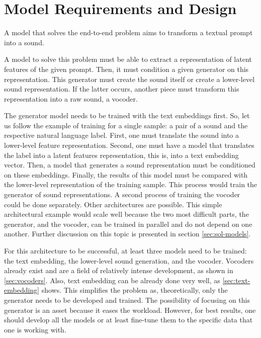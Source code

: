 \section{Model Requirements and Design} \label{sec:model}

A model that solves the end-to-end problem aims to transform a textual prompt into a sound.

A model to solve this problem must be able to extract a representation of latent features of the given prompt. Then, it must condition a given generator on this representation. This generator must create the sound itself or create a lower-level sound representation. If the latter occurs, another piece must transform this representation into a raw sound, a vocoder.

The generator model needs to be trained with the text embeddings first. So, let us follow the example of training for a single sample: a pair of a sound and the respective natural language label. First, one must translate the sound into a lower-level feature representation. Second, one must have a model that translates the label into a latent features representation, this is, into a text embedding vector. Then, a model that generates a sound representation must be conditioned on these embeddings. Finally, the results of this model must be compared with the lower-level representation of the training sample. This process would train the generator of sound representations. A second process of training the vocoder could be done separately. Other architectures are possible. This simple architectural example would scale well because the two most difficult parts, the generator, and the vocoder, can be trained in parallel and do not depend on one another. Further discussion on this topic is presented in section \ref{sec:sol-models}.

For this architecture to be successful, at least three models need to be trained: the text embedding, the lower-level sound generation, and the vocoder. Vocoders already exist and are a field of relatively intense development, as shown in \ref{sec:vocoders}. Also, text embedding can be already done very well, as \ref{sec:text-embedding} shows. This simplifies the problem as, theoretically, only the generator needs to be developed and trained. The possibility of focusing on this generator is an asset because it eases the workload. However, for best results, one should develop all the models or at least fine-tune them to the specific data that one is working with.